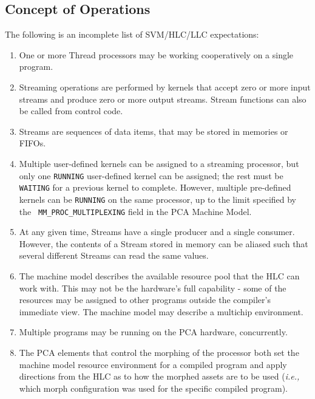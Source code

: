 \subsection{Concept of Operations}

The following is an incomplete list of SVM/HLC/LLC expectations:

\renewcommand{\labelenumi}{\theenumi.}

\begin{enumerate}

\item One or more Thread processors may be working cooperatively on a
single program.

\item Streaming operations are performed by kernels that accept zero
or more input streams and produce zero or more output streams.  Stream
functions can also be called from control code.

\item Streams are sequences of data items, that may be stored in
memories or FIFOs.

\item Multiple user-defined kernels can be assigned to a streaming
processor, but only one {\tt RUNNING} user-defined kernel can be
assigned; the rest must be {\tt WAITING} for a previous kernel to
complete.  However, multiple pre-defined kernels can be {\tt RUNNING}
on the same processor, up to the limit specified by the {\tt
MM\_PROC\_MULTIPLEXING} field in the PCA Machine Model.

\item At any given time, Streams have a single producer and a single
consumer.  However, the contents of a Stream stored in memory can be
aliased such that several different Streams can read the same values.

\item The machine model describes the available resource pool that the
HLC can work with.  This may not be the hardware's full capability -
some of the resources may be assigned to other programs outside the
compiler's immediate view.  The machine model may describe a multichip
environment.

\item Multiple programs may be running on the PCA hardware,
concurrently.

\item The PCA elements that control the morphing of the processor both
set the machine model resource environment for a compiled program and
apply directions from the HLC as to how the morphed assets are to be
used ({\it i.e.,} which morph configuration was used for the specific
compiled program).


\end{enumerate}
